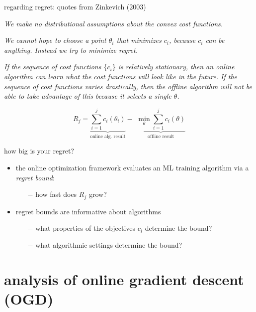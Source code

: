 \documentclass[xcolor={svgnames},
               hyperref={colorlinks,citecolor=DeepPink4,linkcolor=FireBrick,urlcolor=Maroon}]
               {beamer}
\begin{document}
\begin{frame}{regarding regret: quotes from Zinkevich (2003)}

\emph{We make \alert{no distributional assumptions} about the convex cost functions.}

\medskip
\noindent \emph{We cannot hope to choose a point $\theta_i$ that minimizes $c_i$, because $c_i$ can be anything. Instead we try to \alert{minimize regret}.}

\medskip
\noindent \emph{If the sequence of cost functions $\{c_i\}$ is relatively stationary, then an online algorithm can learn what the cost functions will look like in the future.  If the sequence of cost functions varies drastically, then the offline algorithm will not be able to take advantage of this because it selects a single $\theta$.}

  $$R_j = \underbrace{\sum_{i=1}^j c_i(\theta_i)}_{\text{online alg.~result}} - \,\, \underbrace{\min_\theta \sum_{i=1}^j c_i(\theta)}_{\text{offline result}}$$
\end{frame}


\begin{frame}{how big is your regret?}

\begin{itemize}
\item the online optimization framework evaluates an ML training algorithm via a \emph{regret bound}:
    \begin{itemize}
    \item[$-$] how fast does $R_j$ grow?
    \end{itemize}
\item regret bounds are informative about algorithms
    \begin{itemize}
    \item[$-$] what properties of the objectives $c_i$ determine the bound?
    \item[$-$] what algorithmic settings determine the bound?
    \end{itemize}
\end{itemize}
\end{frame}


\section{analysis of online gradient descent (OGD)}
\end{document}
